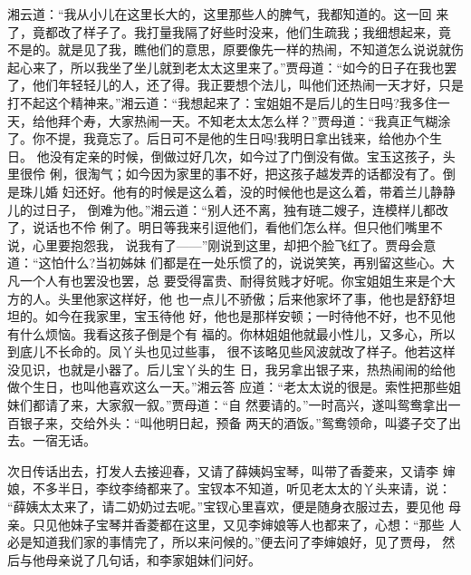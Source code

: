 湘云道：“我从小儿在这里长大的，这里那些人的脾气，我都知道的。这一回
来了，竟都改了样子了。我打量我隔了好些时没来，他们生疏我；我细想起来，竟
不是的。就是见了我，瞧他们的意思，原要像先一样的热闹，不知道怎么说说就伤
起心来了，所以我坐了坐儿就到老太太这里来了。”贾母道：“如今的日子在我也罢
了，他们年轻轻儿的人，还了得。我正要想个法儿，叫他们还热闹一天才好，只是
打不起这个精神来。”湘云道：“我想起来了：宝姐姐不是后儿的生日吗?我多住一
天，给他拜个寿，大家热闹一天。不知老太太怎么样？”贾母道：“我真正气糊涂
了。你不提，我竟忘了。后日可不是他的生日吗!我明日拿出钱来，给他办个生日。
他没有定亲的时候，倒做过好几次，如今过了门倒没有做。宝玉这孩子，头里很伶
俐，很淘气；如今因为家里的事不好，把这孩子越发弄的话都没有了。倒是珠儿婚
妇还好。他有的时候是这么着，没的时候他也是这么着，带着兰儿静静儿的过日子，
倒难为他。”湘云道：“别人还不离，独有琏二嫂子，连模样儿都改了，说话也不伶
俐了。明日等我来引逗他们，看他们怎么样。但只他们嘴里不说，心里要抱怨我，
说我有了——”刚说到这里，却把个脸飞红了。贾母会意道：“这怕什么?当初姊妹
们都是在一处乐惯了的，说说笑笑，再别留这些心。大凡一个人有也罢没也罢，总
要受得富贵、耐得贫贱才好呢。你宝姐姐生来是个大方的人。头里他家这样好，他
也一点儿不骄傲；后来他家坏了事，他也是舒舒坦坦的。如今在我家里，宝玉待他
好，他也是那样安顿；一时待他不好，也不见他有什么烦恼。我看这孩子倒是个有
福的。你林姐姐他就最小性儿，又多心，所以到底儿不长命的。凤丫头也见过些事，
很不该略见些风波就改了样子。他若这样没见识，也就是小器了。后儿宝丫头的生
日，我另拿出银子来，热热闹闹的给他做个生日，也叫他喜欢这么一天。”湘云答
应道：“老太太说的很是。索性把那些姐妹们都请了来，大家叙一叙。”贾母道：“自
然要请的。”一时高兴，遂叫鸳鸯拿出一百银子来，交给外头：“叫他明日起，预备
两天的酒饭。”鸳鸯领命，叫婆子交了出去。一宿无话。

次日传话出去，打发人去接迎春，又请了薛姨妈宝琴，叫带了香菱来，又请李
婶娘，不多半日，李纹李绮都来了。宝钗本不知道，听见老太太的丫头来请，说：
“薛姨太太来了，请二奶奶过去呢。”宝钗心里喜欢，便是随身衣服过去，要见他
母亲。只见他妹子宝琴并香菱都在这里，又见李婶娘等人也都来了，心想：“那些
人必是知道我们家的事情完了，所以来问候的。”便去问了李婶娘好，见了贾母，
然后与他母亲说了几句话，和李家姐妹们问好。

